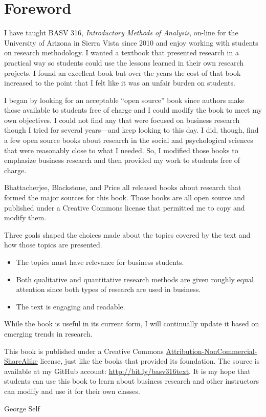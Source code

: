 \chapter*{Foreword}\label{ch:foreword}

I have taught BASV 316, \textit{Introductory Methods of Analysis}, on-line for the University of Arizona in Sierra Vista since 2010 and enjoy working with students on research methodology. I wanted a textbook that presented research in a practical way so students could use the lessons learned in their own research projects. I found an excellent book but over the years the cost of that book increased to the point that I felt like it was an unfair burden on students. 

I began by looking for an acceptable ``open source'' book since authors make those available to students free of charge and I could modify the book to meet my own objectives. I could not find any that were focused on business research though I tried for several years—and keep looking to this day. I did, though, find a few open source books about research in the social and psychological sciences that were reasonably close to what I needed. So, I modified those books to emphasize business research and then provided my work to students free of charge. 

Bhattacherjee\cite{bhattacherjee2012social}, Blackstone\cite{blackstone2012principles}, and Price\cite{price2015research} all released books about research that formed the major sources for this book. Those books are all open source and published under a Creative Commons license that permitted me to copy and modify them.

Three goals shaped the choices made about the topics covered by the text and how those topics are presented. 

\begin{itemize}
	\item The topics must have relevance for business students. 
	\item Both qualitative and quantitative research methods are given roughly equal attention since both types of research are used in business. 
	\item The text is engaging and readable.
\end{itemize}

While the book is useful in its current form, I will continually update it based on emerging trends in research. 

This book is published under a Creative Commons \href{https://creativecommons.org/licenses/by-nc-sa/4.0/legalcode}{ Attribution-NonCommercial-ShareAlike} license, just like the books that provided its foundation. The source is available at my GitHub account: \url{http://bit.ly/basv316text}. It is my hope that students can use this book to learn about business research and other instructors can modify and use it for their own classes.

\bigskip
\begin{flushright}
  \textemdash \; George Self
\end{flushright}
